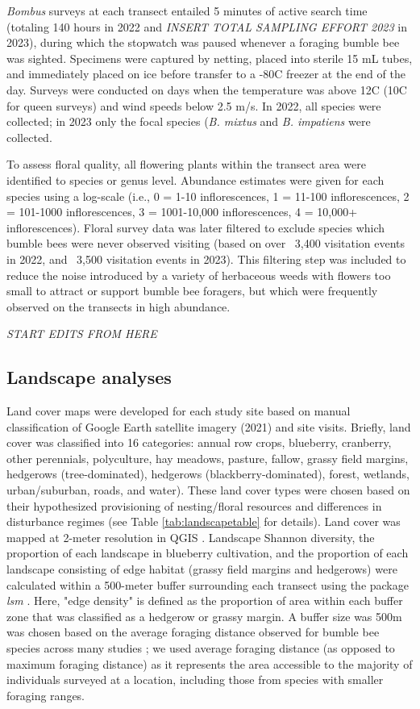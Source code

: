 \documentclass[12pt]{article}
\begin{document}
\textit{Bombus} surveys at each transect entailed 5 minutes of active search time (totaling 140 hours in 2022 and \emph{INSERT TOTAL SAMPLING EFFORT 2023} in 2023), during which the stopwatch was paused whenever a foraging bumble bee was sighted. Specimens were captured by netting, placed into sterile 15 mL tubes, and immediately placed on ice before transfer to a -80\degree C freezer at the end of the day.  Surveys were conducted on days when the temperature was above 12\degree C (10\degree C for queen surveys) and wind speeds below 2.5 m/s. In 2022, all  species were collected; in 2023 only the focal species (\textit{B. mixtus} and \textit{B. impatiens} were collected.

To assess floral quality, all flowering plants within the transect area were identified to species or genus level. Abundance estimates were given for each species using a log-scale (i.e., 0 = 1-10 inflorescences, 1 = 11-100 inflorescences, 2 = 101-1000 inflorescences, 3 = 1001-10,000 inflorescences,  4 = 10,000+ inflorescences). Floral survey data was later filtered to exclude species which bumble bees were never observed visiting (based on over ~3,400 visitation events in 2022, and ~3,500 visitation events in 2023). This filtering step was included to reduce the noise introduced by a variety of herbaceous weeds with flowers too small to attract or support bumble bee foragers, but which were frequently observed on the transects in high abundance. 


\emph{START EDITS FROM HERE}
\subsection{Landscape analyses}
Land cover maps were developed for each study site based on manual classification of Google Earth satellite imagery (2021) and site visits. Briefly, land cover was classified into 16 categories: annual row crops, blueberry, cranberry, other perennials, polyculture, hay meadows, pasture, fallow, grassy field margins, hedgerows (tree-dominated), hedgerows (blackberry-dominated), forest, wetlands, urban/suburban, roads, and water). These land cover types were chosen based on their hypothesized provisioning of nesting/floral resources and differences in disturbance regimes (see Table \ref{tab:landscapetable} for details). Land cover was mapped at 2-meter resolution in QGIS \parencite{QGIS_software}. Landscape Shannon diversity, the proportion of each landscape in blueberry cultivation, and the proportion of each landscape consisting of edge habitat (grassy field margins and hedgerows) were calculated within a 500-meter buffer surrounding each transect using the package \textit{lsm} \parencite{lsm-package}. Here, "edge density" is defined as the proportion of area within each buffer zone that was classified as a hedgerow or grassy margin. A buffer size was 500m was chosen based on the average foraging distance observed for bumble bee species across many studies \parencite{molaReview2025}; we used average foraging distance (as opposed to maximum foraging distance) as it represents the area accessible to the majority of individuals surveyed at a location, including those from species with smaller foraging ranges.
\end{document}
